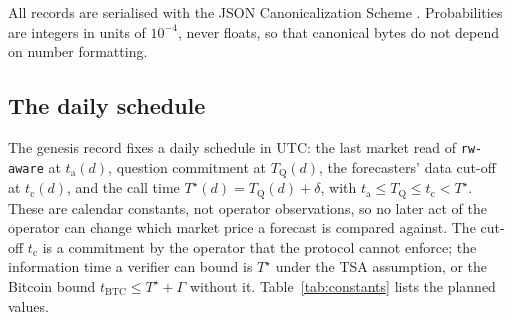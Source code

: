 \documentclass[11pt]{article}
\newcommand{\Ts}{T^{\star}}
\newcommand{\tQ}{T_{\mathrm{Q}}}
\newcommand{\tc}{t_{\mathrm{c}}}
\newcommand{\ta}{t_{\mathrm{a}}}
\begin{document}
All records are serialised with the JSON Canonicalization Scheme \citep{rfc8785}. Probabilities are integers in units of $10^{-4}$, never floats, so that canonical bytes do not depend on number formatting.

\subsection{The daily schedule}

The genesis record fixes a daily schedule in UTC: the last market read of \texttt{rw-aware} at $\ta(d)$, question commitment at $\tQ(d)$, the forecasters' data cut-off at $\tc(d)$, and the call time $\Ts(d) = \tQ(d) + \delta$, with $\ta \le \tQ \le \tc < \Ts$. These are calendar constants, not operator observations, so no later act of the operator can change which market price a forecast is compared against. The cut-off $\tc$ is a commitment by the operator that the protocol cannot enforce; the information time a verifier can bound is $\Ts$ under the TSA assumption, or the Bitcoin bound $t_{\mathrm{BTC}} \le \Ts + \Gamma$ without it. Table~\ref{tab:constants} lists the planned values.
\end{document}
